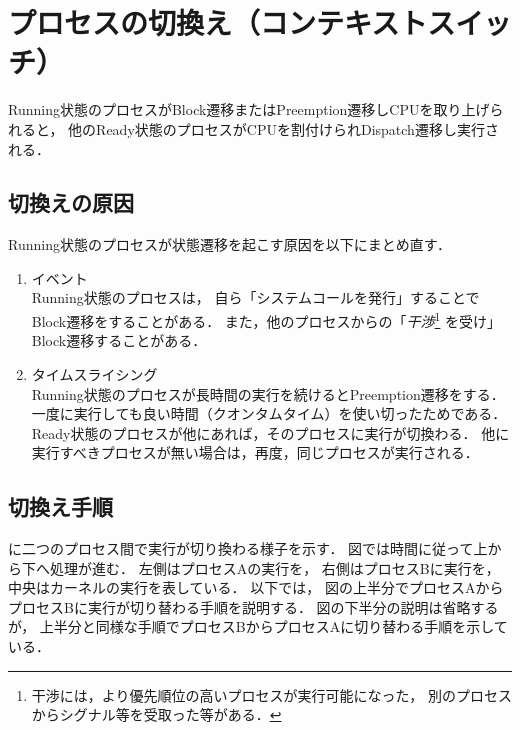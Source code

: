 \section{プロセスの切換え（コンテキストスイッチ）}
Running状態のプロセスがBlock遷移またはPreemption遷移しCPUを取り上げられると，
他のReady状態のプロセスがCPUを割付けられDispatch遷移し実行される．

\subsection{切換えの原因}
Running状態のプロセスが状態遷移を起こす原因を以下にまとめ直す．

\begin{enumerate}
\item イベント \\
  Running状態のプロセスは，
  自ら「システムコールを発行」することでBlock遷移をすることがある．
  また，他のプロセスからの「\emph{干渉}\footnote{
      干渉には，より優先順位の高いプロセスが実行可能になった，
      別のプロセスからシグナル等を受取った等がある．}
    を受け」Block遷移することがある．
\item タイムスライシング \\
  Running状態のプロセスが長時間の実行を続けるとPreemption遷移をする．
  一度に実行しても良い時間（クオンタムタイム）を使い切ったためである．
  Ready状態のプロセスが他にあれば，そのプロセスに実行が切換わる．
  他に実行すべきプロセスが無い場合は，再度，同じプロセスが実行される．
\end{enumerate}

\subsection{切換え手順}
に二つのプロセス間で実行が切り換わる様子を示す．
図では時間に従って上から下へ処理が進む．
左側はプロセスAの実行を，
右側はプロセスBに実行を，
中央はカーネルの実行を表している．
以下では，
図の上半分でプロセスAからプロセスBに実行が切り替わる手順を説明する．
図の下半分の説明は省略するが，
上半分と同様な手順でプロセスBからプロセスAに切り替わる手順を示している．


